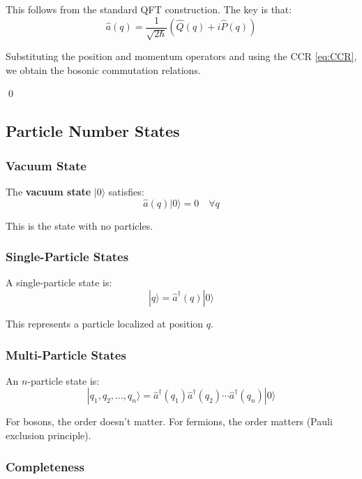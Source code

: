 This follows from the standard QFT construction. The key is that:
\begin{equation}
\hat{a}(q) = \frac{1}{\sqrt{2\hbar}} \left(\hat{Q}(q) + i \hat{P}(q)\right)
\end{equation}

Substituting the position and momentum operators and using the CCR \eqref{eq:CCR}, we obtain the bosonic commutation relations.

\qed

\subsection{Particle Number States}

\subsubsection{Vacuum State}

The \textbf{vacuum state} $|0\rangle$ satisfies:
\begin{equation}
\hat{a}(q) |0\rangle = 0 \quad \forall q
\end{equation}

This is the state with no particles.

\subsubsection{Single-Particle States}

A single-particle state is:
\begin{equation}
|q\rangle = \hat{a}^{\dagger}(q) |0\rangle
\end{equation}

This represents a particle localized at position $q$.

\subsubsection{Multi-Particle States}

An $n$-particle state is:
\begin{equation}
|q_1, q_2, \dots, q_n\rangle = \hat{a}^{\dagger}(q_1) \hat{a}^{\dagger}(q_2) \cdots \hat{a}^{\dagger}(q_n) |0\rangle
\end{equation}

For bosons, the order doesn't matter. For fermions, the order matters (Pauli exclusion principle).

\subsubsection{Completeness}

